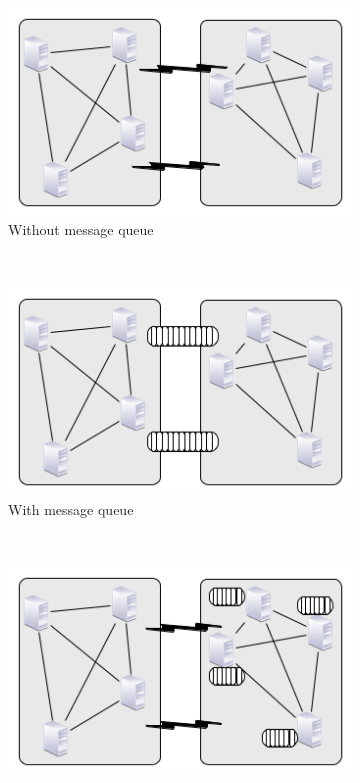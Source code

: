 \documentclass{vldb}
\begin{document}
\begin{figure}
    \centering
    \begin{subfigure}[b]{0.32\textwidth}
        \includegraphics[width=\textwidth]{no_queue}
        \caption{Without message queue}
        \label{fig_no_queue}
    \end{subfigure}
    ~ %
    \begin{subfigure}[b]{0.32\textwidth}
        \includegraphics[width=\textwidth]{yes_queue}
        \caption{With message queue}
        \label{fig_yes_queue}
    \end{subfigure}
    ~ %
    \begin{subfigure}[b]{0.32\textwidth}
        \includegraphics[width=\textwidth]{node_queue}

\end{subfigure}
\end{figure}
\end{document}
